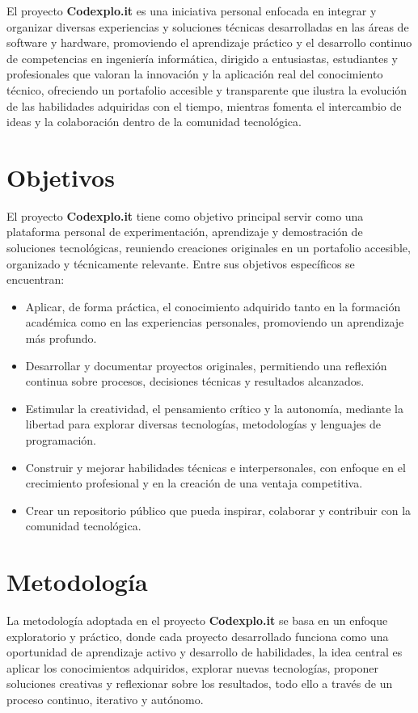 \documentclass[10pt, a4paper, oneside]{article}
\begin{document}
El proyecto \textbf{Codexplo.it} es una iniciativa personal enfocada en integrar y organizar diversas experiencias y soluciones técnicas desarrolladas en las áreas de software y hardware, promoviendo el aprendizaje práctico y el desarrollo continuo de competencias en ingeniería informática, dirigido a entusiastas, estudiantes y profesionales que valoran la innovación y la aplicación real del conocimiento técnico, ofreciendo un portafolio accesible y transparente que ilustra la evolución de las habilidades adquiridas con el tiempo, mientras fomenta el intercambio de ideas y la colaboración dentro de la comunidad tecnológica.

\section{Objetivos}

El proyecto \textbf{Codexplo.it} tiene como objetivo principal servir como una plataforma personal de experimentación, aprendizaje y demostración de soluciones tecnológicas, reuniendo creaciones originales en un portafolio accesible, organizado y técnicamente relevante. Entre sus objetivos específicos se encuentran:

\begin{itemize}
  \item Aplicar, de forma práctica, el conocimiento adquirido tanto en la formación académica como en las experiencias personales, promoviendo un aprendizaje más profundo.
  \item Desarrollar y documentar proyectos originales, permitiendo una reflexión continua sobre procesos, decisiones técnicas y resultados alcanzados.
  \item Estimular la creatividad, el pensamiento crítico y la autonomía, mediante la libertad para explorar diversas tecnologías, metodologías y lenguajes de programación.
  \item Construir y mejorar habilidades técnicas e interpersonales, con enfoque en el crecimiento profesional y en la creación de una ventaja competitiva.
  \item Crear un repositorio público que pueda inspirar, colaborar y contribuir con la comunidad tecnológica.\newpage
\end{itemize}

\section{Metodología}

La metodología adoptada en el proyecto \textbf{Codexplo.it} se basa en un enfoque exploratorio y práctico, donde cada proyecto desarrollado funciona como una oportunidad de aprendizaje activo y desarrollo de habilidades, la idea central es aplicar los conocimientos adquiridos, explorar nuevas tecnologías, proponer soluciones creativas y reflexionar sobre los resultados, todo ello a través de un proceso continuo, iterativo y autónomo.
\end{document}
